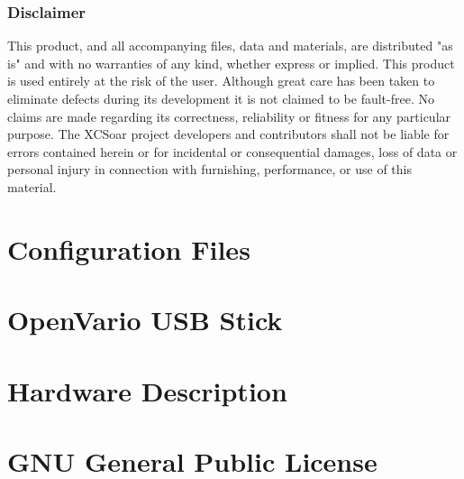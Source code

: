 \documentclass[english,a4paper,11pt]{refrep}
\begin{document}
\subsection*{Disclaimer}
This product, and all accompanying files, data and materials, are
distributed "as is" and with no warranties of any kind, whether
express or implied.  This product is used entirely at the risk of the
user.  Although great care has been taken to eliminate defects during
its development it is not claimed to be fault-free. No claims are made
regarding its correctness, reliability or fitness for any particular
purpose.  The XCSoar project developers and contributors shall not be
liable for errors contained herein or for incidental or consequential
damages, loss of data or personal injury in connection with
furnishing, performance, or use of this material.












\pagestyle{empty}\hypersetup{linkcolor=orange}
\printindex

\appendix

\chapter{Configuration Files}\label{cha:config-files}


\chapter{OpenVario USB Stick}\label{cha:usb-stick}


\chapter{Hardware Description}\label{cha:hwd-description}


\chapter{GNU General Public License}\label{cha:gnu-general-public}


\end{document}

